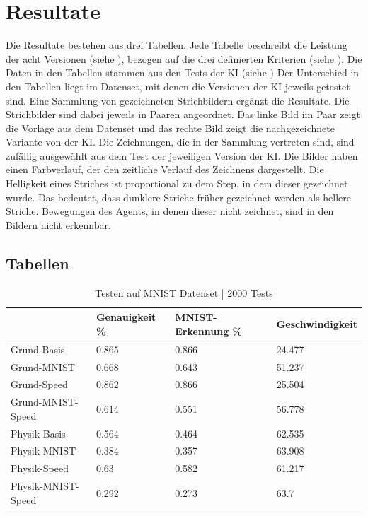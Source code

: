 \chapter{Resultate}
Die Resultate bestehen aus drei Tabellen. Jede Tabelle beschreibt die Leistung
der acht Versionen (siehe ), bezogen auf die drei definierten
Kriterien (siehe ). Die Daten in den Tabellen
stammen aus den Tests der KI (siehe )
Der Unterschied in den Tabellen liegt im Datenset, mit denen die Versionen der
KI jeweils getestet sind. 
Eine Sammlung von gezeichneten Strichbildern ergänzt die Resultate. Die
Strichbilder sind dabei jeweils in Paaren angeordnet. Das linke Bild im Paar
zeigt die Vorlage aus dem Datenset und das rechte Bild zeigt die nachgezeichnete
Variante von der KI. Die Zeichnungen, die in der Sammlung
vertreten sind, sind zufällig ausgewählt aus dem Test der jeweiligen Version der
KI. Die Bilder haben einen Farbverlauf, der den zeitliche
Verlauf des Zeichnens dargestellt. Die Helligkeit eines Striches ist
proportional zu dem Step, in dem dieser gezeichnet wurde. Das bedeutet, dass
dunklere Striche früher gezeichnet werden als hellere Striche. Bewegungen des
Agents, in denen dieser nicht zeichnet, sind in den Bildern nicht erkennbar.

\newpage
\section{Tabellen}
\begin{table}[!ht]
    \centering
    \caption{Testen auf MNIST Datenset | 2000 Tests}
    \begin{tabular}{|l|l|l|l|}
        \hline
            ~ & Genauigkeit \% & MNIST-Erkennung \% & Geschwindigkeit \\ \hline
            Grund-Basis & 0.865 & 0.866 & 24.477 \\ \hline
            Grund-MNIST & 0.668 & 0.643 & 51.237 \\ \hline
            Grund-Speed & 0.862 & 0.866 & 25.504 \\ \hline
            Grund-MNIST-Speed & 0.614 & 0.551 & 56.778 \\ \hline
            Physik-Basis & 0.564 & 0.464 & 62.535 \\ \hline
            Physik-MNIST & 0.384 & 0.357 & 63.908 \\ \hline
            Physik-Speed & 0.63 & 0.582 & 61.217 \\ \hline
            Physik-MNIST-Speed & 0.292 & 0.273 & 63.7 \\ \hline
        \end{tabular}
    \label{tab:MNIST}
\end{table}

